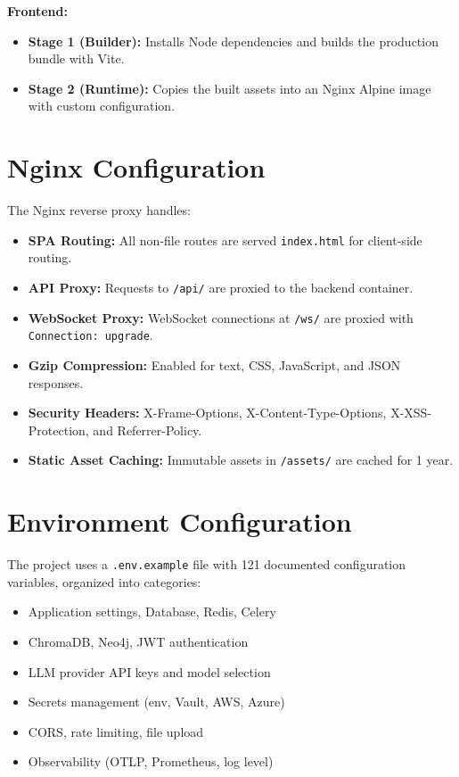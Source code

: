 \documentclass[12pt, a4paper]{report}
\begin{document}
\textbf{Frontend:}
\begin{itemize}
    \item \textbf{Stage 1 (Builder):} Installs Node dependencies and builds the production bundle with Vite.
    \item \textbf{Stage 2 (Runtime):} Copies the built assets into an Nginx Alpine image with custom configuration.
\end{itemize}

\section{Nginx Configuration}

The Nginx reverse proxy handles:
\begin{itemize}
    \item \textbf{SPA Routing:} All non-file routes are served \texttt{index.html} for client-side routing.
    \item \textbf{API Proxy:} Requests to \texttt{/api/} are proxied to the backend container.
    \item \textbf{WebSocket Proxy:} WebSocket connections at \texttt{/ws/} are proxied with \texttt{Connection: upgrade}.
    \item \textbf{Gzip Compression:} Enabled for text, CSS, JavaScript, and JSON responses.
    \item \textbf{Security Headers:} X-Frame-Options, X-Content-Type-Options, X-XSS-Protection, and Referrer-Policy.
    \item \textbf{Static Asset Caching:} Immutable assets in \texttt{/assets/} are cached for 1 year.
\end{itemize}

\section{Environment Configuration}

The project uses a \texttt{.env.example} file with 121 documented configuration variables, organized into categories:
\begin{itemize}
    \item Application settings, Database, Redis, Celery
    \item ChromaDB, Neo4j, JWT authentication
    \item LLM provider API keys and model selection
    \item Secrets management (env, Vault, AWS, Azure)
    \item CORS, rate limiting, file upload
    \item Observability (OTLP, Prometheus, log level)
\end{itemize}
\end{document}
